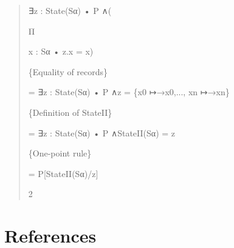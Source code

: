 \documentclass[11pt]{article}
\begin{document}
\begin{quote}\small\raggedright
∃z : State(Sα) • P ∧(
\par
Π
\par
x : Sα • z.x = x)
\par
\{Equality of records\}
\par
= ∃z : State(Sα) • P ∧z = \{x0 ↦→x0,..., xn ↦→xn\}
\par
\{Definition of StateII\}
\par
= ∃z : State(Sα) • P ∧StateII(Sα) = z
\par
\{One-point rule\}
\par
= P[StateII(Sα)/z]
\par
2
\end{quote}

\section*{References}
\end{document}
